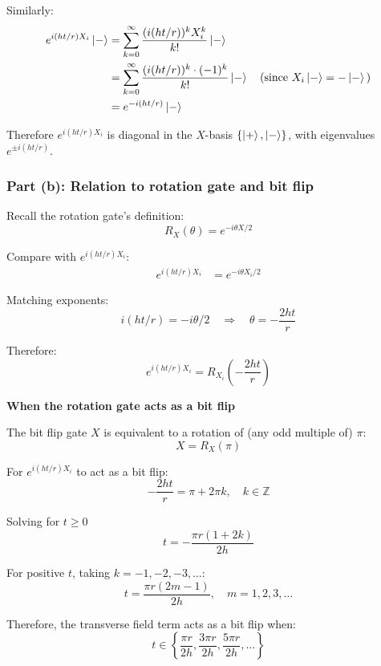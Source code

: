 \documentclass[11pt]{article}
\begin{document}
Similarly:
\begin{align}
e^{i(ht/r) X_i} \ket{-} &= \sum_{k=0}^{\infty} \frac{(i(ht/r))^k X_i^k}{k!} \ket{-} \\
&= \sum_{k=0}^{\infty} \frac{(i(ht/r))^k \cdot (-1)^k}{k!} \ket{-} \quad \text{(since } X_i\ket{-} = -\ket{-}\text{)} \\
&= e^{-i(ht/r)} \ket{-}
\end{align}

Therefore $e^{i(ht/r)X_i}$ is diagonal in the $X$-basis $\{\ket{+}, \ket{-}\}$, with eigenvalues $e^{\pm i(ht/r)}$.
\subsubsection*{Part (b): Relation to rotation gate and bit flip}

Recall the rotation gate's definition:
\begin{equation}
R_X(\theta) = e^{-i\theta X/2}
\end{equation}

Compare with $e^{i(ht/r) X_i}$:
\begin{align}
e^{i(ht/r) X_i} &= e^{-i\theta X_i/2}
\end{align}

Matching exponents:
\begin{equation}
i(ht/r) = -i\theta/2 \quad \Rightarrow \quad \theta = -\frac{2ht}{r}
\end{equation}

Therefore:
\begin{equation}
e^{i(ht/r) X_i} = R_{X_i}\left(-\frac{2ht}{r}\right)
\end{equation}

\textbf{When the rotation gate acts as a bit flip}

The bit flip gate $X$ is equivalent to a rotation of (any odd multiple of) $\pi$:
\begin{equation}
X = R_X(\pi)
\end{equation}

For $e^{i(ht/r) X_i}$ to act as a bit flip:
\begin{equation}
-\frac{2ht}{r} = \pi + 2\pi k, \quad k \in \mathbb{Z}
\end{equation}

Solving for $t \geq 0$
\begin{equation}
t = -\frac{\pi r(1 + 2k)}{2h}
\end{equation}

For positive $t$, taking $k = -1, -2, -3, \ldots$:
\begin{equation}
t = \frac{\pi r(2m - 1)}{2h}, \quad m = 1, 2, 3, \ldots
\end{equation}

Therefore, the transverse field term acts as a bit flip when:
\begin{equation}
t \in \left\{ \frac{\pi r}{2h}, \frac{3\pi r}{2h}, \frac{5\pi r}{2h}, \ldots \right\}
\end{equation}
\end{document}
